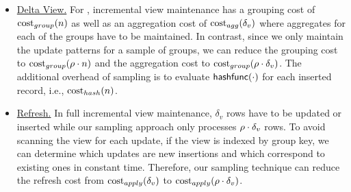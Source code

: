 \begin{itemize}
\item \underline{Delta View.} For \aggview, incremental view maintenance has a grouping cost of $\textrm{cost}_{group}(n)$ as well as an aggregation cost of $\textrm{cost}_{agg}(\delta_v)$ where aggregates for each of the groups have to be maintained. In contrast, since we only maintain the update patterns for a sample of groups, we can reduce the grouping cost to $\textrm{cost}_{group}(\rho  \cdot n)$ and the aggregation cost to $\textrm{cost}_{group}(\rho  \cdot \delta_v)$. The additional overhead of sampling is to evaluate $\textsf{hashfunc}(\cdot)$ for each inserted record, i.e., $\textrm{cost}_{hash}(n)$.  \vspace{-0.5em}
\item \underline{Refresh.} 
In full incremental view maintenance, $\delta_v$ rows have to be updated or inserted while our sampling approach only processes $\rho  \cdot \delta_v$ rows. 
To avoid scanning the view for each update, if the view is indexed by group key, we can determine which updates are new insertions and which correspond to existing ones in constant time. 
Therefore, our sampling technique can reduce the refresh cost from $\textrm{cost}_{apply}(\delta_v)$ to $\textrm{cost}_{apply}(\rho \cdot \delta_v)$.

\vspace{-0.25em}

\end{itemize}

